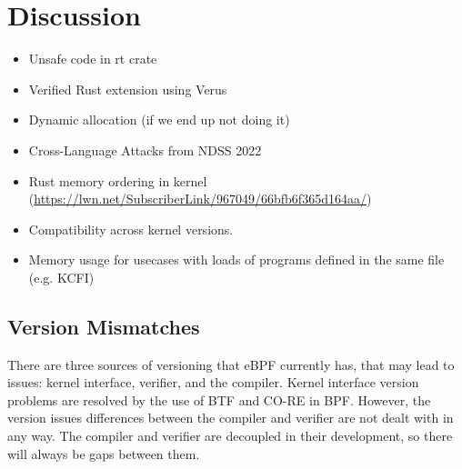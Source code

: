 \section{Discussion}
\begin{itemize}
    \item Unsafe code in rt crate
    \item Verified Rust extension using Verus
    \item Dynamic allocation (if we end up not doing it)
    \item Cross-Language Attacks from NDSS 2022
    \item Rust memory ordering in kernel (\url{https://lwn.net/SubscriberLink/967049/66bfb6f365d164aa/})
    \item Compatibility \projname{} across kernel versions.
    \item Memory usage for usecases with loads of programs defined in the same
        file (e.g. KCFI)
\end{itemize}

\subsection{Version Mismatches}
There are three sources of versioning that eBPF currently has, that may lead to issues: kernel interface, verifier, and the compiler.
Kernel interface version problems are resolved by the use of BTF and CO-RE in BPF.
However, the version issues differences between the compiler and verifier are not dealt
    with in any way.
The compiler and verifier are decoupled in their development, so there will 
    always be gaps between them.


